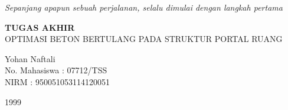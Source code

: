 \thispagestyle{empty}
\vspace*{6cm}
\begin{center}
\textit{Sepanjang apapun sebuah perjalanan, selalu dimulai dengan langkah pertama}
\end{center}
\clearpage

\thispagestyle{empty}
\vspace*{4cm}
\begin{center}
{\large\bfseries TUGAS AKHIR}\\[0.3cm]
OPTIMASI BETON BERTULANG PADA STRUKTUR PORTAL RUANG

\vspace{1cm}
Yohan Naftali\\
No. Mahasiswa : 07712/TSS\\
NIRM : 950051053114120051

\vspace{1cm}
1999
\end{center}
\clearpage
